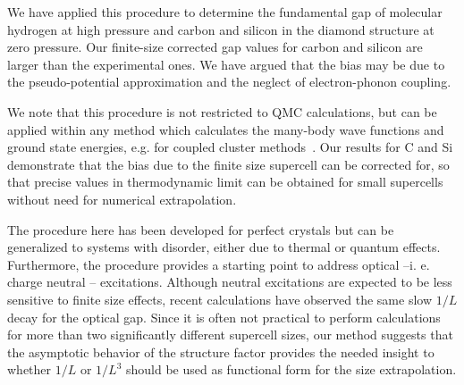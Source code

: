 We have applied this procedure to determine the fundamental gap of molecular hydrogen at high pressure
and carbon and silicon in the diamond structure at zero pressure. Our finite-size corrected gap values for carbon and silicon are larger than the experimental
ones. We have argued that the bias may be due to the pseudo-potential approximation and the neglect of electron-phonon coupling.

We note that this procedure is not restricted to QMC calculations, but can be applied
within any method which calculates the many-body wave functions and ground state energies,
e.g. for coupled cluster methods~\cite{Gruber18}. Our results for C and Si demonstrate that
the bias due to the finite size supercell can be corrected for, so that
precise values in thermodynamic limit can be obtained for small supercells
without need for numerical extrapolation.

The procedure here has been developed for perfect crystals but can be generalized 
to systems with disorder, either due to thermal or quantum effects. Furthermore, the procedure provides a starting point 
to address optical --i. e.  charge neutral -- excitations. Although neutral excitations are expected to be less sensitive to finite size effects,
recent calculations \cite{Hunt,Frank19} have observed the same slow $1/L$ decay for the 
optical gap. Since it is often not practical to perform calculations for more than two significantly different supercell sizes, our method suggests that 
the asymptotic behavior of the structure factor provides
the needed insight to whether $1/L$ or $1/L^3$ should be used as functional form for the
size extrapolation.

